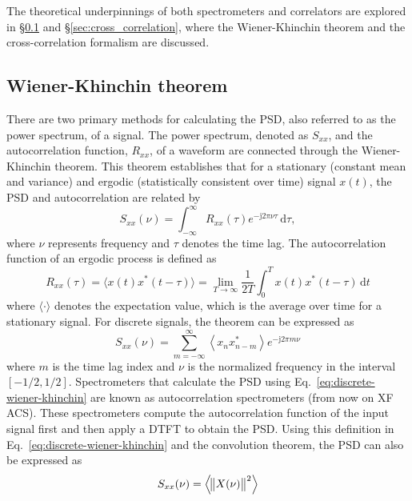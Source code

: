 The theoretical underpinnings of both spectrometers and correlators are explored in \S\ref{sec:wiener-khinchin} and \S\ref{sec:cross_correlation}, where the Wiener-Khinchin theorem and the cross-correlation formalism are discussed.

\subsection{Wiener-Khinchin theorem}
\label{sec:wiener-khinchin}
There are two primary methods for calculating the PSD, also referred to as the power spectrum, of a signal. The power spectrum, denoted as $S_{xx}$, and the autocorrelation function, $R_{xx}$, of a waveform are connected through the Wiener-Khinchin theorem. This theorem establishes that for a stationary (constant mean and variance) and ergodic (statistically consistent over time) signal $x(t)$, the PSD and autocorrelation are related by
\begin{equation}
	S_{xx}(\nu) = \int_{-\infty}^{\infty} R_{xx}(\tau) e^{- \mathrm{j} 2\pi \nu \tau} \, \mathrm{d}\tau,
	\label{eq:continous-wiener-khinchin}
\end{equation}
where $\nu$ represents frequency and $\tau$ denotes the time lag. The autocorrelation function of an ergodic process is defined as \citep{Gubner_2006}
\begin{equation}
	R_{xx}(\tau) =  \langle x(t) x^*(t - \tau)\rangle = \lim_{T \to \infty} \frac{1}{2T} \int_{0}^{T} x(t) x^*(t - \tau) \, \mathrm{d}t
	\label{eq:continous_autocorrelation}
\end{equation}
where $\langle \cdot \rangle$ denotes the expectation value, which is the average over time for a stationary signal. For discrete signals, the theorem can be expressed as
\begin{equation}
	S_{xx}(\nu) = \sum_{m=-\infty}^{\infty} \left\langle x_n x^*_{n - m} \right\rangle e^{-\mathrm{j}2\pi m \nu}
	\label{eq:discrete-wiener-khinchin}
\end{equation}
where $m$ is the time lag index and $\nu$ is the normalized frequency in the interval $[-1/2,1/2]$. Spectrometers that calculate the PSD using Eq.\ \ref{eq:discrete-wiener-khinchin} are known as autocorrelation spectrometers (from now on XF ACS). These spectrometers compute the autocorrelation function of the input signal first and then apply a DTFT to obtain the PSD. Using this definition in Eq.\ \ref{eq:discrete-wiener-khinchin} and the convolution theorem, the PSD can also be expressed as
\begin{equation}
	S_{xx}(\nu) = \left\langle \norm{X(\nu)}^2 \right\rangle
	\label{eq:discrete_psd}
\end{equation}
